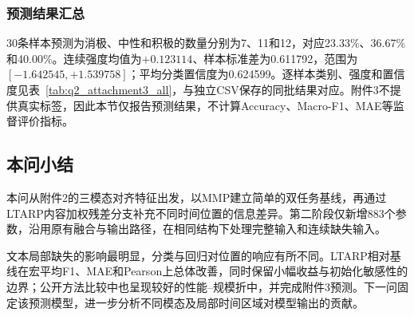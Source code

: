 \documentclass[UTF8,a4paper,11pt]{ctexart}
\newcommand{\QTwoParagraph}{\par\noindent\hspace*{2em}}
\newcounter{q2algorithm}
\begin{document}
\subsubsection{预测结果汇总}
\QTwoParagraph 30条样本预测为消极、中性和积极的数量分别为7、11和12，对应23.33\%、36.67\%和40.00\%。连续强度均值为$+0.123114$、样本标准差为0.611792，范围为$[-1.642545,+1.539758]$；平均分类置信度为0.624599。逐样本类别、强度和置信度见表~\ref{tab:q2_attachment3_all}，与独立CSV保存的同批结果对应。附件3不提供真实标签，因此本节仅报告预测结果，不计算Accuracy、Macro-F1、MAE等监督评价指标。


\FloatBarrier

\subsection{本问小结}\label{subsec:q2_summary}
\QTwoParagraph 本问从附件2的三模态对齐特征出发，以MMP建立简单的双任务基线，再通过LTARP内容加权残差分支补充不同时间位置的信息差异。第二阶段仅新增883个参数，沿用原有融合与输出路径，在相同结构下处理完整输入和连续缺失输入。

\QTwoParagraph 文本局部缺失的影响最明显，分类与回归对位置的响应有所不同。LTARP相对基线在宏平均F1、MAE和Pearson上总体改善，同时保留小幅收益与初始化敏感性的边界；公开方法比较中也呈现较好的性能--规模折中，并完成附件3预测。下一问固定该预测模型，进一步分析不同模态及局部时间区域对模型输出的贡献。
\end{document}
